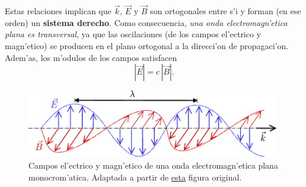 Estas relaciones implican que $\vec{k}$, $\vec{E}$ y $\vec{B}$ son ortogonales
entre s'i y forman (en ese orden) un \textbf{sistema derecho}. Como consecuencia, \textit{una onda electromagn'etica plana es transversal}, ya que las oscilaciones (de los campos el'ectrico y magn'etico) se producen en el plano ortogonal a la direcci'on de propagaci'on. Adem'as, los m'odulos de los campos satisfacen
\begin{equation}
 | \vec{E}|=c\,| \vec{B}| .
\end{equation}
\begin{figure}[!h]
\centerline{\includegraphics[height=3cm]{fig/fig-onda-electromagnetica.pdf}}
\caption{Campos el'ectrico y magn'etico de una onda electromagn'etica plana monocrom'atica. Adaptada a partir de \href{http://commons.wikimedia.org/wiki/File:Onde_electromagnetique.svg}{esta} figura original.}
\label{ondaem}
\end{figure}

